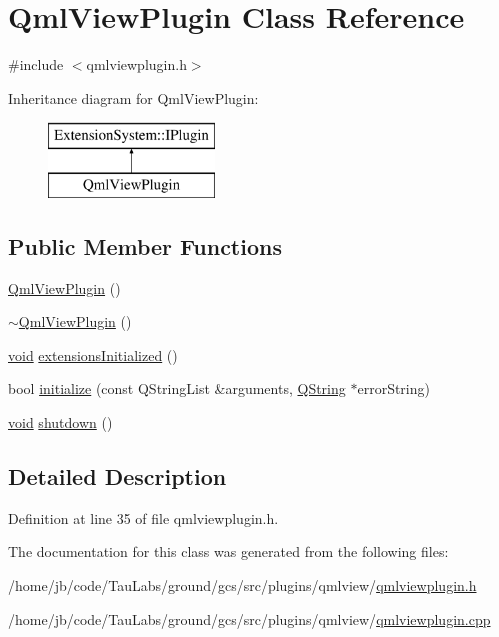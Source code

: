 \hypertarget{class_qml_view_plugin}{\section{\-Qml\-View\-Plugin \-Class \-Reference}
\label{class_qml_view_plugin}
}


{\ttfamily \#include $<$qmlviewplugin.\-h$>$}

\-Inheritance diagram for \-Qml\-View\-Plugin\-:\begin{figure}[H]
\begin{center}
\leavevmode
\includegraphics[height=2.000000cm]{class_qml_view_plugin}
\end{center}
\end{figure}
\subsection*{\-Public \-Member \-Functions}
\begin{DoxyCompactItemize}
\item 
\hyperlink{group___o_p_map_plugin_ga1276ad345027c9b33c40edc2e447dd98}{\-Qml\-View\-Plugin} ()
\item 
\hyperlink{group___o_p_map_plugin_gab669bd345bdb7a755f4f767edf44f5fc}{$\sim$\-Qml\-View\-Plugin} ()
\item 
\hyperlink{group___u_a_v_objects_plugin_ga444cf2ff3f0ecbe028adce838d373f5c}{void} \hyperlink{group___o_p_map_plugin_ga36fa5cb525a31c9b6877a3da80262f69}{extensions\-Initialized} ()
\item 
bool \hyperlink{group___o_p_map_plugin_ga07810591116e8f592fca15a0fe4e3b1d}{initialize} (const \-Q\-String\-List \&arguments, \hyperlink{group___u_a_v_objects_plugin_gab9d252f49c333c94a72f97ce3105a32d}{\-Q\-String} $\ast$error\-String)
\item 
\hyperlink{group___u_a_v_objects_plugin_ga444cf2ff3f0ecbe028adce838d373f5c}{void} \hyperlink{group___o_p_map_plugin_ga181dc94c5cc23521ffde448715c6ad8e}{shutdown} ()
\end{DoxyCompactItemize}


\subsection{\-Detailed \-Description}


\-Definition at line 35 of file qmlviewplugin.\-h.



\-The documentation for this class was generated from the following files\-:\begin{DoxyCompactItemize}
\item 
/home/jb/code/\-Tau\-Labs/ground/gcs/src/plugins/qmlview/\hyperlink{qmlviewplugin_8h}{qmlviewplugin.\-h}\item 
/home/jb/code/\-Tau\-Labs/ground/gcs/src/plugins/qmlview/\hyperlink{qmlviewplugin_8cpp}{qmlviewplugin.\-cpp}\end{DoxyCompactItemize}
